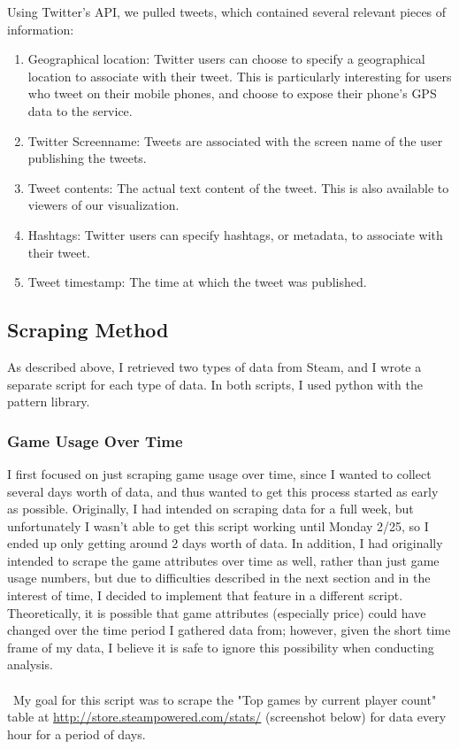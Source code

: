 \documentclass[pdftex,12pt,a4paper]{article}
\begin{document}
Using Twitter's API, we pulled tweets, which contained several relevant pieces of information:
\begin{enumerate}
\item Geographical location: Twitter users can choose to specify a geographical location to associate with their tweet. This is particularly interesting for users who tweet on their mobile phones, and choose to expose their phone's GPS data to the service.
\item Twitter Screenname: Tweets are associated with the screen name of the user publishing the tweets.
\item Tweet contents: The actual text content of the tweet. This is also available to viewers of our visualization.
\item Hashtags: Twitter users can specify hashtags, or metadata, to associate with their tweet. 
\item Tweet timestamp: The time at which the tweet was published.
\end{enumerate}

\subsection{Scraping Method}
As described above, I retrieved two types of data from Steam, and I wrote a separate script for each type of data. In both scripts, I used python with the pattern library.
\subsubsection{Game Usage Over Time}
I first focused on just scraping game usage over time, since I wanted to collect several days worth of data, and thus wanted to get this process started as early as possible. Originally, I had intended on scraping data for a full week, but unfortunately I wasn't able to get this script working until Monday 2/25, so I ended up only getting around 2 days worth of data. In addition, I had originally intended to scrape the game attributes over time as well, rather than just game usage numbers, but due to difficulties described in the next section and in the interest of time, I decided to implement that feature in a different script. Theoretically, it is possible that game attributes (especially price) could have changed over the time period I gathered data from; however, given the short time frame of my data, I believe it is safe to ignore this possibility when conducting analysis. \\ \\\
My goal for this script was to scrape the "Top games by current player count" table at \url{http://store.steampowered.com/stats/} (screenshot below) for data every hour for a period of days. \\\\
\end{document}
